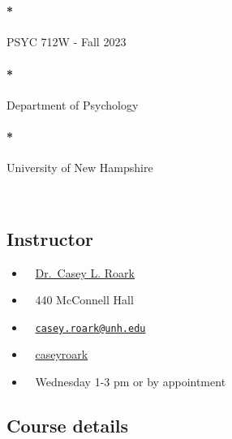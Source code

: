 \documentclass[
  letterpaper,
  DIV=11,
  numbers=noendperiod]{scrreprt}
\let\oldparagraph\paragraph
\renewcommand{\paragraph}[1]{\oldparagraph{#1}\mbox{}}
\providecommand{\tightlist}{%
  \setlength{\itemsep}{0pt}\setlength{\parskip}{0pt}}\usepackage{longtable,booktabs,array}
\begin{document}
~

\hypertarget{psyc-712w---fall-2023}{%
\paragraph*{\texorpdfstring{{PSYC 712W - Fall
2023}}{PSYC 712W - Fall 2023}}\label{psyc-712w---fall-2023}}

\hypertarget{department-of-psychology}{%
\paragraph*{\texorpdfstring{{Department of
Psychology}}{Department of Psychology}}\label{department-of-psychology}}

\hypertarget{university-of-new-hampshire}{%
\paragraph*{\texorpdfstring{{University of New
Hampshire}}{University of New Hampshire}}\label{university-of-new-hampshire}}

~

\hypertarget{instructor}{%
\subsection*{Instructor}\label{instructor}}

\begin{itemize}
\tightlist
\item
   ~ \href{www.roarklab.com}{Dr.~Casey L. Roark}
\item
   ~ 440 McConnell Hall
\item
   ~
  \href{mailto:casey.roark@unh.edu}{\nolinkurl{casey.roark@unh.edu}}
\item
   ~
  \href{https://www.twitter.com/caseyroark}{caseyroark}
\item
   ~ Wednesday 1-3 pm or by appointment
\end{itemize}

\hypertarget{course-details}{%
\subsection*{Course details}\label{course-details}}
\end{document}
